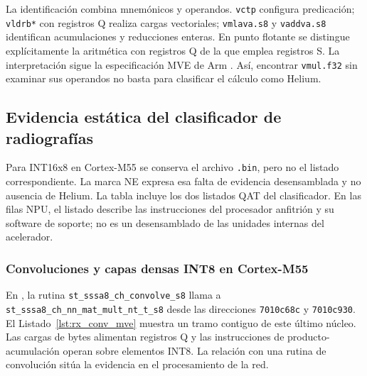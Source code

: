 La identificación combina mnemónicos y operandos. \texttt{vctp} configura predicación; \texttt{vldrb*} con registros Q realiza cargas vectoriales; \texttt{vmlava.s8} y \texttt{vaddva.s8} identifican acumulaciones y reducciones enteras. En punto flotante se distingue explícitamente la aritmética con registros Q de la que emplea registros S. La interpretación sigue la especificación MVE de Arm \cite{cap4_acle}. Así, encontrar \texttt{vmul.f32} sin examinar sus operandos no basta para clasificar el cálculo como Helium.

\FloatBarrier
\subsection{Evidencia estática del clasificador de radiografías}\label{sec:helium_rx}

Para INT16x8 en Cortex-M55 se conserva el archivo \texttt{.bin}, pero no el listado correspondiente. La marca NE expresa esa falta de evidencia desensamblada y no ausencia de Helium. La tabla incluye los dos listados QAT del clasificador. En las filas NPU, el listado describe las instrucciones del procesador anfitrión y su software de soporte; no es un desensamblado de las unidades internas del acelerador.

\subsubsection{Convoluciones y capas densas INT8 en Cortex-M55}
En , la rutina \texttt{st\_\allowbreak sssa8\_\allowbreak ch\_\allowbreak convolve\_\allowbreak s8} llama a \texttt{st\_\allowbreak sssa8\_\allowbreak ch\_\allowbreak nn\_\allowbreak mat\_\allowbreak mult\_\allowbreak nt\_\allowbreak t\_\allowbreak s8} desde las direcciones \texttt{7010c68c} y \texttt{7010c930}. El Listado~\ref{lst:rx_conv_mve} muestra un tramo contiguo de este último núcleo. Las cargas de bytes alimentan registros Q y las instrucciones de producto-acumulación operan sobre elementos INT8. La relación con una rutina de convolución sitúa la evidencia en el procesamiento de la red.


\noindent\begin{minipage}{\linewidth}

\end{minipage}

